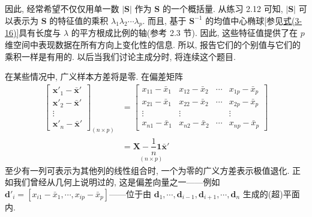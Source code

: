 因此, 经常希望不仅仅用单一数 $|\mathbf{S}|$ 作为 $\mathbf{S}$ 的一个概括量. 从练习 2.12 可知, $|\mathbf{S}|$ 可以表示为 $\mathbf{S}$ 的特征值的乘积 $\lambda_{1}\lambda_{2}\cdots\lambda_{p}$. 而且, 基于 $\mathbf{S}^{-1}$ 的均值中心椭球[参见\hyperref[eq:3-16]{式(3-16)}]具有长度与 $\lambda$ 的平方根成比例的轴(参考 2.3 节). 因此, 这些特征值提供了在 $p$ 维空间中表现数据在所有方向上变化性的信息. 所以, 报告它们的个别值与它们的乘积一样是有用的. 以后当我们讨论主成分时, 将连续这个题目.


在某些情况中, 广义样本方差将是零. 在偏差矩阵
\label{eq:3-18}
\begin{equation}
\begin{aligned}
\begin{bmatrix}\mathbf{x}'_{1}-\bar{\mathbf{x}}'\\[2pt]\mathbf{x}'_{2}-\bar{\mathbf{x}}'\\[2pt]\vdots\\[2pt]\mathbf{x}'_{n}-\bar{\mathbf{x}}'\end{bmatrix}_{(n\times p)}
&=\begin{bmatrix}x_{11}-\bar{x}_{1}&x_{12}-\bar{x}_{2}&\cdots&x_{1p}-\bar{x}_{p}\\[2pt]x_{21}-\bar{x}_{1}&x_{22}-\bar{x}_{2}&\cdots&x_{2p}-\bar{x}_{p}\\[2pt]\vdots&\vdots&&\vdots\\[2pt]x_{n1}-\bar{x}_{1}&x_{n2}-\bar{x}_{2}&\cdots&x_{np}-\bar{x}_{p}\end{bmatrix}\\[6pt]
&=\underset{(n\times p)}{\mathbf{X}-\dfrac{1}{n}\mathbf{1}\bar{\mathbf{x}}'}
\end{aligned}
\tag{3-18}
\end{equation}
至少有一列可表示为其他列的线性组合时, 一个为零的广义方差表示极值退化. 正如我们曾经从几何上说明过的, 这是偏差向量之一——例如 $\mathbf{d}'_{i}=[x_{i1}-\bar{x}_{1},\cdots,x_{ip}-\bar{x}_{p}]$——位于由 $\mathbf{d}_{1},\cdots,\mathbf{d}_{i-1},\mathbf{d}_{i+1},\cdots,\mathbf{d}_{n}$ 生成的(超)平面内.


